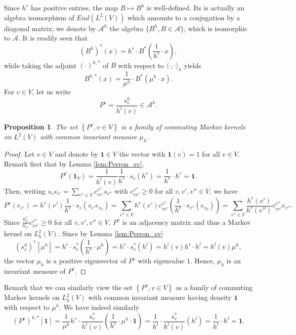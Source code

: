 \documentclass[10pt,11pt]{amsart}%
\newtheorem{proposition}[theorem]{Proposition}
\begin{document}
Since $h^r$ has positive entries, the map $B\mapsto B^h$ is well-defined. Its is actually an algebra isomorphism of $End(L^2(V))$ which amounts to a conjugation by a diagonal matrix; we denote by $\mathcal{A}^h$ the algebra $\{B^h, B\in \mathcal{A}\}$, which is isomorphic to $\mathcal{A}$. It is readily seen that 
$$(B^h)^*(x)=h^r\cdot B^*\left(\frac{1}{h^r}\cdot x\right),$$
while taking the adjoint $(\cdot)^{h,*}$ of $B$ with respect to $\langle \cdot,\cdot\rangle_h$ yields 
$$B^{h,*}(x)=\frac{1}{\mu^h}\cdot B^*\left(\mu^h\cdot x\right).$$
For $v\in V$, let us write 
$$P^v=\frac{s_v^h}{h^l(v)}\in \mathcal{A}^h.$$
\begin{proposition}
The set $\left\{P^v, v\in V\right\}$ is a family of commuting Markov kernels on $L^2(V)$ with common invariant measure $\mu_h$.
\end{proposition}
\begin{proof}
Let $v\in V$ and denote by $\mathbf{1}\in V$ the vector with $\mathbf{1}(v)=1$ for all $v\in V$. Remark first that by Lemma \ref{lem:Perron_sv},
$$P^v(\mathbf{1}_V)=\frac{1}{h^l(v)}\frac{1}{h^r}\cdot s_v(h^r)=\frac{1}{h^r}\cdot h^r=\mathbf{1}.$$
Then, writing $s_{v}s_{v'}=\sum_{v''\in V}c_{vv'}^{v''}s_{v''}$ with $c_{vv'}^{v''}\geq 0$ for all $v,v',v''\in V$, we have
$$P^v(e_{v'})=h^r(v')\frac{1}{h^r}\cdot s_v(s_{v'}e_{v_0})=\sum_{v''\in V}h^r(v')c_{vv'}^{v''}\left(\frac{1}{h^r}\cdot s_{v''}(e_{v_0})\right)=\sum_{v''\in V}\frac{h^r(v')}{h^r(v'')}c_{vv'}^{v''}e_{v''}.$$
Since $\frac{h^r_{v'}}{h^r_{v''}}c_{vv'}^{v''}\geq 0$ for all $v,v',v''\in V$, $P^v$ is an adjacency matrix and thus a Markov kernel on $L^2_h(V)$. Since by Lemma \ref{lem:Perron_sv}
$$(s_v^h)^*[\mu^h]=h^r\cdot s_v^*\left(\frac{1}{h^r}\cdot \mu^h\right)=h^r\cdot s_v^*(h^l)=h^l(v)h^r\cdot h^l=h^l(v)\mu^h,$$
the vector $\mu_h$ is a positive eigenvector of $P^v$ with eigenvalue $1$. Hence, $\mu_h$ is an invariant measure of $P^v$.
\end{proof}
Remark that we can similarly view the set $\left\{P^v, v\in V\right\}$ as a family of commuting Markov kernels on $L^2_h(V)$ with common invariant measure having density $\mathbf{1}$ with respect to $\mu^h$. We have indeed similarly
$$(P^v)^{h,*}[\mathbf{1}]=\frac{1}{\mu^h}h^r\cdot \frac{s_v^*}{h^l(v)}\left(\frac{1}{h^r}\cdot \mu^h\cdot \mathbf{1}\right)=\frac{1}{h^l}\cdot \frac{s_v^*}{h^l(v)}(h^l)=\frac{1}{h^l}\cdot h^l=\mathbf{1}.$$
\end{document}
